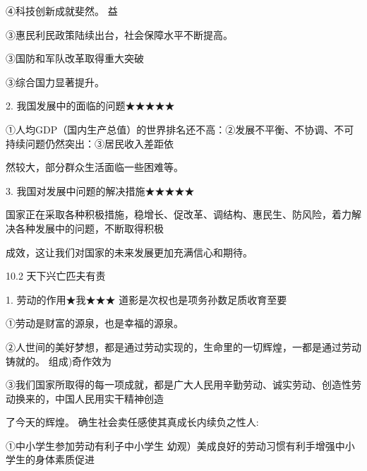 \documentclass[lang=cn,11pt]{elegantbook}
\newcommand{\daofasym}[1]{{\daofasymbolfont #1}}
\newcommand{\daofasym}[1]{#1}
\begin{document}
\daofasym{④}科技创新成就斐然。 益\par

\daofasym{③}惠民利民政策陆续出台，社会保障水平不断提高。\par

\daofasym{③}国防和军队改革取得重大突破\par

\daofasym{③}综合国力显著提升。\par

2. 我国发展中的面临的问题\daofasym{★}\daofasym{★}\daofasym{★}\daofasym{★}\daofasym{★}\par

\daofasym{①}人均GDP（国内生产总值）的世界排名还不高：\daofasym{②}发展不平衡、不协调、不可持续问题仍然突出：\daofasym{③}居民收入差距依\par

然较大，部分群众生活面临一些困难等。\par

3. 我国对发展中问题的解决措施\daofasym{★}\daofasym{★}\daofasym{★}\daofasym{★}\daofasym{★}\par

国家正在采取各种积极措施，稳增长、促改革、调结构、惠民生、防风险，着力解决各种发展中的问题，不断取得积极\par

成效，这让我们对国家的未来发展更加充满信心和期待。\par

10.2 天下兴亡匹夫有责\par

1. 劳动的作用\daofasym{★}我\daofasym{★}\daofasym{★}\daofasym{★} 道影是次权也是项务孙数足质收育至要\par

\daofasym{①}劳动是财富的源泉，也是幸福的源泉。\par

\daofasym{②}人世间的美好梦想，都是通过劳动实现的，生命里的一切辉煌，一都是通过劳动铸就的。 组成)奇作效为\par

\daofasym{③}我们国家所取得的每一项成就，都是广大人民用辛勤劳动、诚实劳动、创造性劳动换来的，中国人民用实干精神创造\par

了今天的辉煌。 确生社会卖任感使其真成长内续负之性人:\par

\daofasym{①}中小学生参加劳动有利子中小学生 幼观）美成良好的劳动习惯有利手增强中小学生的身体素质促进\par
\end{document}
